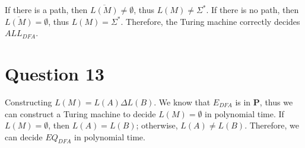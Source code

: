 \documentclass[a4paper, UTF-8]{article}
\theoremstyle{plain}
\begin{document}
If there is a path, then $\overline{L(M)} \ne \emptyset$, thus $L(M) \ne \Sigma^*$. If there is no path, then $\overline{L(M)} = \emptyset$, thus $L(M) = \Sigma^*$. Therefore, the Turing machine correctly decides $ALL_{DFA}$.

\section{Question 13}

Constructing $L(M) = L(A) \Delta L(B)$. We know that $E_{DFA}$ is in $\textbf{P}$, thus we can construct a Turing machine to decide $L(M) = \emptyset$ in polynomial time. If $L(M) = \emptyset$, then $L(A) = L(B)$; otherwise, $L(A) \ne L(B)$. Therefore, we can decide $EQ_{DFA}$ in polynomial time.
\end{document}
